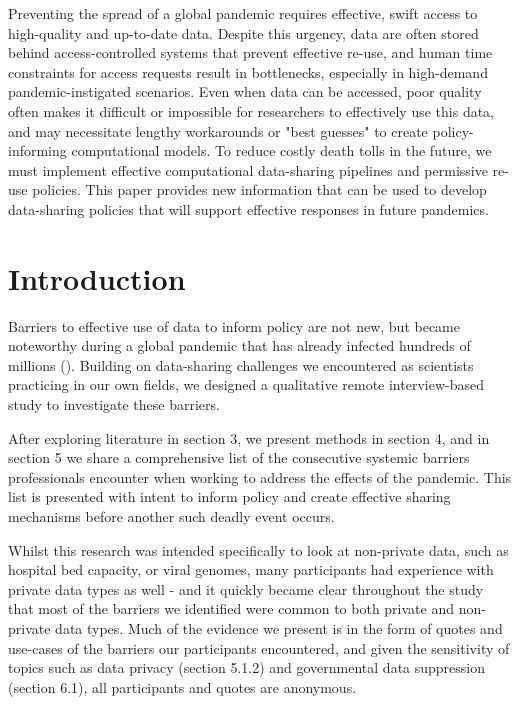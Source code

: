 \documentclass{CUP-JNL-DAP}%
\begin{document}
\begin{Frontmatter}
\begin{policy}
Preventing the spread of a global pandemic requires effective, swift access to high-quality and up-to-date data. Despite this urgency,  data are often stored behind access-controlled systems that prevent effective re-use, and human time constraints for access requests result in bottlenecks, especially in high-demand pandemic-instigated scenarios. Even when data can be accessed, poor quality often makes it difficult or impossible for researchers to effectively use this data, and may necessitate lengthy workarounds or "best guesses" to create policy-informing computational models. To reduce costly death tolls in the future, we must implement effective computational data-sharing pipelines and permissive re-use policies. This paper provides new information that can be used to develop data-sharing policies that will support effective responses in future pandemics.
\end{policy}
\end{Frontmatter}


\section{Introduction}
Barriers to effective use of data to inform policy are not new, but became noteworthy during a global pandemic that has already infected hundreds of millions (\cite{owidcoronavirus}). Building on data-sharing challenges we encountered as scientists practicing in our own fields, we designed a qualitative remote interview-based study to investigate these barriers. 

After exploring literature in section 3, we present methods in section 4, and in section 5 we share a comprehensive list of the consecutive systemic barriers professionals encounter when working to address the effects of the pandemic. This list is presented with intent to inform policy and create effective sharing mechanisms before another such deadly event occurs. 

Whilst this research was intended specifically to look at non-private data, such as hospital bed capacity, or viral genomes,  many participants had experience with private data types as well - and it quickly became clear throughout the study that most of the barriers we identified were common to both private and non-private data types.  Much of the evidence we present is in the form of quotes and use-cases of the barriers our participants encountered, and given the sensitivity of topics such as data privacy (section 5.1.2) and governmental data suppression (section 6.1), all participants and quotes are anonymous. 
\end{document}

